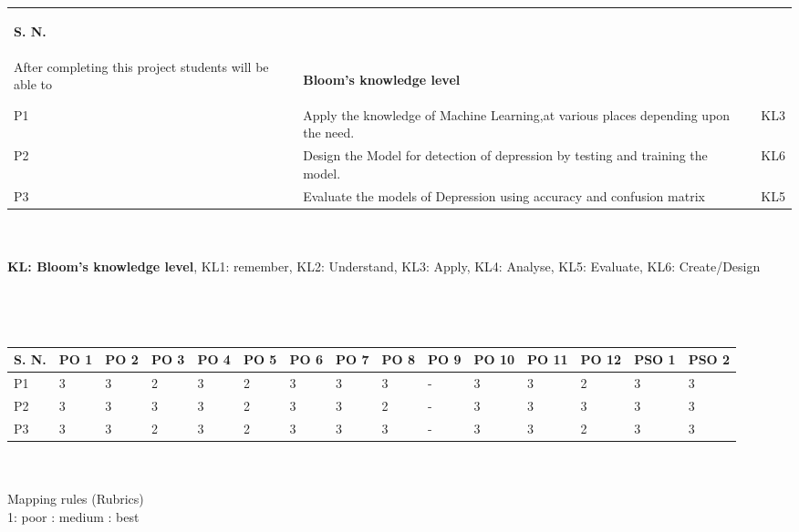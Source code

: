 \section*{}
	\begin{tabular}{|p{1cm}|p{12cm}|p{2cm}|}
			\hline
			\begin{center}
				\textbf{S. N.}
			\end{center} &\begin{center}
				 \textbf{Project outcomes}\\ \vspace*{1mm} After completing this project students will be able to
			\end{center} & \begin{center}
				\textbf{Bloom's knowledge level}
			\end{center} \\ 
			\hline
			P1 & Apply the knowledge of Machine Learning,at various places depending upon the need.  
    & KL3 \\ \hline
			P2 & Design the Model for detection of depression  by testing and training the model. &  KL6\\ \hline
			P3 & Evaluate the models of Depression using accuracy and confusion matrix  & KL5\\ \hline
		\end{tabular}
\\
\\
\textbf{KL: Bloom’s knowledge level}, KL1: remember, KL2: Understand, KL3: Apply, KL4: Analyse, KL5: Evaluate, KL6: Create/Design
\\
\\
\\
	\section*{}
	\begin{tabular}{|p{0.8cm}|p{0.55cm}|p{0.55cm}|p{0.55cm}|p{0.55cm}|p{0.55cm}|p{0.55cm}|p{0.55cm}|p{0.55cm}|p{0.55cm}|p{0.55cm}|p{0.55cm}|p{0.55cm}|p{0.55cm}|p{0.55cm}|}
	\hline
	\textbf{S. N.} &\textbf{PO 1} &	\textbf{PO 2} & \textbf{PO 3} & \textbf{PO 4} & \textbf{PO 5} & \textbf{PO 6} & \textbf{PO 7} & \textbf{PO 8} & \textbf{PO 9} & \textbf{PO 10} & \textbf{PO 11} & \textbf{PO 12} & \textbf{PSO 1} & \textbf{PSO 2}\\
	\hline
    P1	& 3 & 3 & 2 & 3 & 2 & 3 &3  &3  &-  &3   &3  &2 &3  & 3   \\
    \hline
    P2	& 3 & 3 & 3 & 3 & 2 & 3 &3  &2  &-  &3  &3  &3  &3  & 3 \\
    \hline
    P3	& 3 & 3 & 2 & 3 & 2 & 3 &3  &3  &-  &3  &3  &2 &3  & 3  \\
    \hline
		\end{tabular}
\\ 
\\ Mapping rules (Rubrics)
\\
1: poor  : medium : best
\pagebreak


